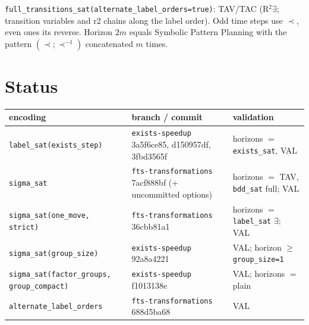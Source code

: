 \documentclass[11pt,a4paper]{article}
\begin{document}
\texttt{full\_transitions\_sat(alternate\_label\_orders=true)}: TAV/TAC (R$^2\exists$; transition variables and r2 chains along the label order). Odd time steps
use $\prec$, even ones its reverse. Horizon $2m$ equals Symbolic Pattern Planning with the pattern
$(\prec;\prec^{-1})$ concatenated $m$ times.

\section{Status}

{\small
\begin{tabular}{@{}p{}p{}p{}@{}}
  \toprule
  encoding & branch / commit & validation \\
  \midrule
  \texttt{label\_sat(exists\_step)} & \texttt{exists-speedup} 3a5f6ce85, d150957df, 3fbd3565f &
    horizons $=$ \texttt{exists\_sat}, VAL \\
  \texttt{sigma\_sat} & \texttt{fts-transformations} 7acf888bf (+ uncommitted options) &
    horizons $=$ TAV, \texttt{bdd\_sat} full; VAL \\
  \texttt{sigma\_sat(one\_move, strict)} & \texttt{fts-transformations} 36cbb81a1 & horizons $=$ \texttt{label\_sat}
    $\exists$; VAL \\
  \texttt{sigma\_sat(group\_size)} & \texttt{exists-speedup} 92a8a4221 & VAL; horizon $\ge$ \texttt{group\_size=1} \\
  \texttt{sigma\_sat(factor\_groups, group\_compact)} & \texttt{exists-speedup} f1013138e & VAL; horizons $=$ plain \\
  \texttt{alternate\_label\_orders} & \texttt{fts-transformations} 688d5ba68 & VAL \\
  \bottomrule
\end{tabular}}
\end{document}
